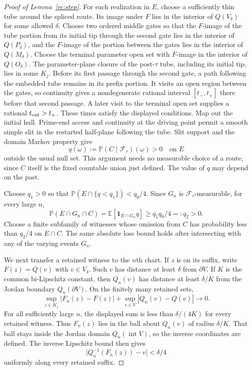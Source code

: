 \begin{proof}[Proof of Lemma~\ref{rc:step}]
For each realization in $E$, choose a sufficiently thin tube around
the spliced route. Its image under $F$ lies in the interior of
$Q(V_\delta)$ for some allowed $\delta$. Choose two ordered middle
gates so that the $F$-image of the tube portion from its initial tip
through the second gate lies in the interior of $Q(P_\delta)$, and
the $F$-image of the portion between the gates lies in the interior
of $Q(M_\delta)$. Choose the terminal parameter open set with
$F$-image in the interior of $Q(O_\delta)$. The parameter-plane closure
of the post-$\tau$ tube, including its initial tip, lies in some $K_j$.
Before its first passage through the second gate, a path following the
embedded tube remains in its prefix portion. It visits an open region
between the gates, so continuity gives a nondegenerate rational interval
$[t_-,t_+]$ there before that second passage. A later visit to the
terminal open set supplies a rational $t_{\rm out}>t_+$. These times
satisfy the displayed conditions. Map out the initial hull. Prime-end
access and continuity at the driving point permit a smooth simple slit in the
restarted half-plane following the tube. Slit support and the domain
Markov property give
\[
 q(\omega):=\mathbb P(C\mid\mathcal F_\tau)(\omega)>0
 \quad\text{on }E
\]
outside the usual null set. This argument needs no measurable choice
of a route, since $C$ itself is the fixed countable union just defined.
The value of $q$ may depend on the past.

Choose $q_1>0$ so that
$\mathbb P(E\cap\{q<q_1\})<q_0/4$. Since $G_n$ is
$\mathcal F_\tau$-measurable, for every large $n$,
\begin{equation}\label{rc:varying-good-events}
 \mathbb P(E\cap G_n\cap C)
 =\mathbb E[\mathbf1_{E\cap G_n}q]
 \ge q_1q_0/4=:q_2>0.
\end{equation}
Choose a finite subfamily of witnesses whose omission from $C$ has
probability less than $q_2/4$ on $E\cap C$. The same absolute loss
bound holds after intersecting with any of the varying events $G_n$.

We next transfer a retained witness to the $n$th chart. If $z$ is on
its suffix, write $F(z)=Q(v)$ with $v\in V_\delta$. Such $v$ has
distance at least $\delta$ from $\partial V$. If $K$ is the common
bi-Lipschitz constant, then $Q_n(v)$ has distance at least $\delta/K$
from the Jordan boundary $Q_n(\partial V)$. On the finitely many
retained sets,
\[
 \sup_{z\in K_j}|F_n(z)-F(z)|
       +\sup_{v\in V}|Q_n(v)-Q(v)|\longrightarrow0.
\]
For all sufficiently large $n$, the displayed sum is less than
$\delta/(4K)$ for every retained witness. Thus $F_n(z)$ lies in the
ball about $Q_n(v)$ of radius $\delta/K$. That ball stays inside
the Jordan domain $Q_n(\operatorname{int}V)$, so the inverse coordinates
are defined. The inverse Lipschitz bound then gives
\[
 \bigl|Q_n^{-1}(F_n(z))-v\bigr|<\delta/4
\]
uniformly along every retained suffix.


\end{proof}
